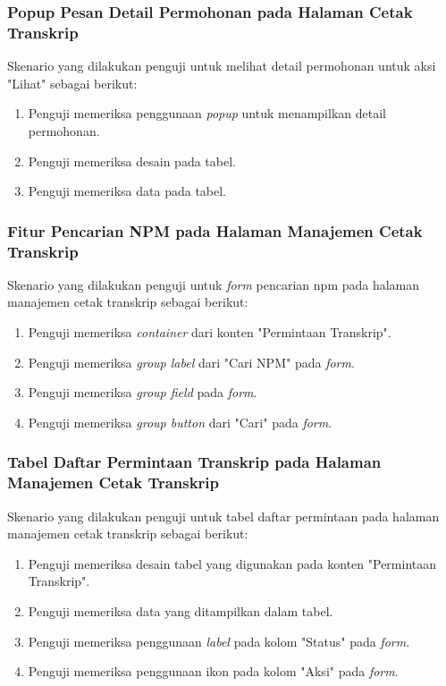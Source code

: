 \subsubsection{Popup Pesan Detail Permohonan pada Halaman Cetak Transkrip}
Skenario yang dilakukan penguji untuk melihat detail permohonan untuk aksi "Lihat" sebagai berikut:
\begin{enumerate}
	\item Penguji memeriksa penggunaan \textit{popup} untuk menampilkan detail permohonan.
	\item Penguji memeriksa desain pada tabel.
	\item Penguji memeriksa data pada tabel.
\end{enumerate}

\subsubsection{Fitur Pencarian NPM pada Halaman Manajemen Cetak Transkrip}
Skenario yang dilakukan penguji untuk \textit{form} pencarian npm pada halaman manajemen cetak transkrip sebagai berikut:
\begin{enumerate}
	\item Penguji memeriksa \textit{container} dari konten "Permintaan Transkrip".
	\item Penguji memeriksa \textit{group label} dari "Cari NPM" pada \textit{form}.	
	\item Penguji memeriksa \textit{group field} pada \textit{form}.	
	\item Penguji memeriksa \textit{group button} dari "Cari" pada \textit{form}.
\end{enumerate}

\subsubsection{Tabel Daftar Permintaan Transkrip pada Halaman Manajemen Cetak Transkrip}
Skenario yang dilakukan penguji untuk tabel daftar permintaan pada halaman manajemen cetak transkrip sebagai berikut:
\begin{enumerate}
	\item Penguji memeriksa desain tabel yang digunakan pada konten "Permintaan Transkrip".
	\item Penguji memeriksa data yang ditampilkan dalam tabel.
	\item Penguji memeriksa penggunaan \textit{label} pada kolom "Status" pada \textit{form}.
	\item Penguji memeriksa penggunaan ikon pada kolom "Aksi" pada \textit{form}.
\end{enumerate}

